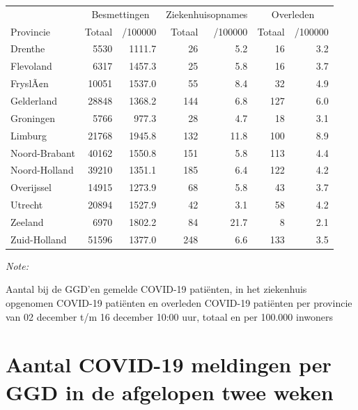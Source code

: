 \documentclass[
  english,
  man,floatsintext]{apa6}
\begin{document}
\begin{table}
\centering
\begin{threeparttable}
\begin{tabular}{lrrrrrr}
\toprule
\multicolumn{1}{c}{ } & \multicolumn{2}{c}{Besmettingen} & \multicolumn{2}{c}{Ziekenhuisopnames} & \multicolumn{2}{c}{Overleden} \\
\cmidrule(l{3pt}r{3pt}){2-3} \cmidrule(l{3pt}r{3pt}){4-5} \cmidrule(l{3pt}r{3pt}){6-7}
Provincie & Totaal & /100000 & Totaal & /100000 & Totaal & /100000\\
\midrule
Drenthe & 5530 & 1111.7 & 26 & 5.2 & 16 & 3.2\\
Flevoland & 6317 & 1457.3 & 25 & 5.8 & 16 & 3.7\\
FryslÃ¢n & 10051 & 1537.0 & 55 & 8.4 & 32 & 4.9\\
Gelderland & 28848 & 1368.2 & 144 & 6.8 & 127 & 6.0\\
Groningen & 5766 & 977.3 & 28 & 4.7 & 18 & 3.1\\
Limburg & 21768 & 1945.8 & 132 & 11.8 & 100 & 8.9\\
Noord-Brabant & 40162 & 1550.8 & 151 & 5.8 & 113 & 4.4\\
Noord-Holland & 39210 & 1351.1 & 185 & 6.4 & 122 & 4.2\\
Overijssel & 14915 & 1273.9 & 68 & 5.8 & 43 & 3.7\\
Utrecht & 20894 & 1527.9 & 42 & 3.1 & 58 & 4.2\\
Zeeland & 6970 & 1802.2 & 84 & 21.7 & 8 & 2.1\\
Zuid-Holland & 51596 & 1377.0 & 248 & 6.6 & 133 & 3.5\\
\bottomrule
\end{tabular}
\begin{tablenotes}
\item \textit{Note: } 
\item Aantal bij de GGD’en gemelde COVID-19 patiënten, in het ziekenhuis opgenomen COVID-19 patiënten en overleden COVID-19 patiënten per provincie van 02 december t/m 16 december 10:00 uur, totaal en per 100.000 inwoners
\end{tablenotes}
\end{threeparttable}
\end{table}

\newpage

\hypertarget{aantal-covid-19-meldingen-per-ggd-in-de-afgelopen-twee-weken}{%
\section{Aantal COVID-19 meldingen per GGD in de afgelopen twee weken}\label{aantal-covid-19-meldingen-per-ggd-in-de-afgelopen-twee-weken}}
\end{document}
